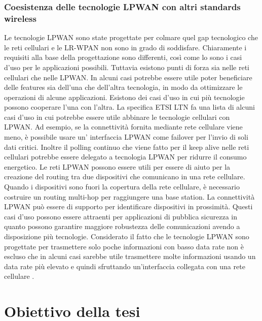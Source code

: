 \documentclass[12pt,a4paper,openright,twoside]{report}
\begin{document}
\section{Coesistenza delle tecnologie LPWAN con altri standards wireless}
Le tecnologie LPWAN sono state progettate per colmare quel gap tecnologico che le reti cellulari e le LR-WPAN non sono in grado di soddisfare. Chiaramente i requisiti alla base della progettazione sono differenti, cos\`i come lo sono i casi d'uso per le applicazioni possibili. 
Tuttavia esistono punti di forza sia nelle reti cellulari che nelle LPWAN. 
In alcuni casi potrebbe essere utile poter beneficiare delle features sia dell'una che dell'altra tecnologia, in modo da ottimizzare le operazioni di alcune applicazioni.					
Esistono dei casi d'uso in cui pi\`u tecnologie possono cooperare l'una con l'altra. 
La specifica ETSI LTN fa una lista di alcuni casi d'uso in cui potrebbe essere utile abbinare le tecnologie cellulari con LPWAN. 
Ad esempio, se la connettivit\`a fornita mediante rete cellulare viene meno, \`e possibile usare un' interfaccia LPWAN come failover per l'invio di soli dati critici. Inoltre il polling continuo che viene fatto per il keep alive nelle reti cellulari potrebbe essere delegato a tecnologia LPWAN per ridurre il consumo energetico.   
Le reti LPWAN possono essere utili per essere di aiuto per la creazione del routing tra due dispositivi che comunicano in una rete cellulare.		
Quando i dispositivi sono fuori la copertura della rete cellulare, \`e necessario costruire un routing multi-hop per raggiungere una base station. La connettivit\`a LPWAN pu\`o essere di supporto per identificare dispositivi in prossimit\`a. Questi casi d'uso possono essere attraenti per applicazioni di pubblica sicurezza in quanto possono garantire maggiore robustezza delle comunicazioni avendo a disposizione pi\`u tecnologie. 
Considerato il fatto che le tecnologie LPWAN sono progettate per trasmettere solo poche informazioni con basso data rate non \`e escluso che in alcuni casi sarebbe utile trasmettere molte informazioni usando un data rate pi\`u elevato e quindi sfruttando un'interfaccia collegata con una rete cellulare \cite{K2}. 







\part{Obiettivo della tesi}
\end{document}
